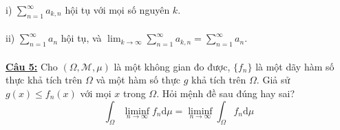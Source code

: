 \documentclass[10pt, a4paper]{article}
\begin{document}
\color{red}i) \color{black}$\displaystyle\sum_{n=1}^\infty a_{k,n}$ hội tụ với mọi số nguyên $k$.\\\\
\color{red}ii) \color{black}$\displaystyle\sum_{n=1}^\infty a_n$ hội tụ, và $\displaystyle\lim_{k\rightarrow\infty}\displaystyle\sum_{n=1}^\infty a_{k,n}=\displaystyle\sum_{n=1}^\infty a_n$.\\\\
\color{red}\underline{\textbf{Câu 5:}} \color{black}Cho $(\Omega,\mathcal M,\mu)$ là một không gian đo được, $\{f_n\}$ là một dãy hàm số thực khả tích trên $\Omega$ và một hàm số thực $g$ khả tích trên $\Omega$. Giả sử $g(x)\le f_n(x)$ với mọi $x$ trong $\Omega$. Hỏi mệnh đề sau đúng hay sai? $$\displaystyle\int_\Omega\displaystyle\liminf_{n\rightarrow\infty}f_n\text{d}\mu=\displaystyle\liminf_{n\rightarrow\infty}\displaystyle\int_\Omega f_n\text{d}\mu$$

\newpage
\end{document}
